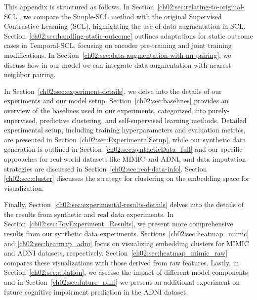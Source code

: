 \label{ch02:apd:first}
This appendix is structured as follows. 
In Section~\ref{ch02:sec:relating-to-original-SCL}, we compare the Simple-SCL method with the original Supervised Contrastive Learning (SCL), highlighting the use of data augmentation in SCL.
Section~\ref{ch02:sec:handling-static-outcome} outlines adaptations for static outcome cases in Temporal-SCL, focusing on encoder pre-training and joint training modifications.
In Section~\ref{ch02:sec:data-augmentation-with-nn-pairing}, we discuss how in our model we can integrate data augmentation with nearest neighbor pairing. 

In Section~\ref{ch02:sec:experiment-details}, we delve into the details of our experiments and our model setup.
Section~\ref{ch02:sec:baselines} provides an overview of the baselines used in our experiments, categorized into purely-supervised, predictive clustering, and self-supervised learning methods. 
Detailed experimental setup, including training hyperparameters and evaluation metrics, are presented in Section~\ref{ch02:sec:ExperimentalSetup}, while our synthetic data generation is outlined in Section~\ref{ch02:sec:syntheticData_full} and our specific approaches for real-world datasets like MIMIC and ADNI, and data imputation strategies are discussed in Section~\ref{ch02:sec:real-data-info}.
Section \ref{ch02:sec:cluster} discusses the strategy for clustering on the embedding space for visualization. 

Finally, Section~\ref{ch02:sec:experimental-results-details} delves into the details of the results from synthetic and real data experiments.
In Section~\ref{ch02:sec:ToyExperiment_Results}, we present more comprehensive results from our synthetic data experiments.
Sections~\ref{ch02:sec:heatmap_mimic} and \ref{ch02:sec:heatmap_adni} focus on visualizing embedding clusters for MIMIC and ADNI datasets, respectively.
Section~\ref{ch02:sec:heatmap_mimic_raw} compares these visualizations with those derived from raw features.
Lastly, in Section~\ref{ch02:sec:ablation}, we assesse the impact of different model components and in Section~\ref{ch02:sec:future_adni} we present an additional experiment on future cognitive impairment prediction in the ADNI dataset.

